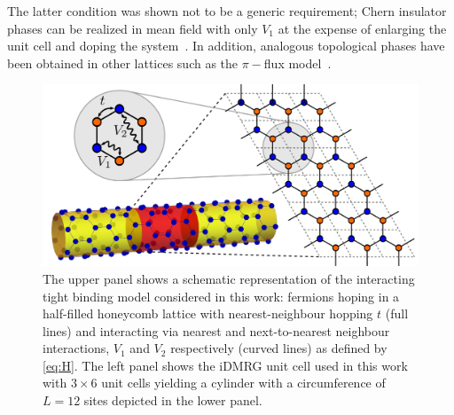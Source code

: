 \documentclass[aps,prx,10pt,twocolumn,floatfix,superscriptaddress,showpacs,numerical,footinbib]{revtex4-1}
\begin{document}
%
The latter condition 
was shown not to be a generic requirement; Chern insulator phases can be realized 
in mean field with only $V_{1}$ at the expense of enlarging the unit cell and doping the system~\cite{CGV11,GCC13}.
%
In addition, analogous topological phases have been obtained in other lattices such as the $\pi-$flux model~\cite{WF10,JGC13}.
%
\begin{figure}
%
 \includegraphics[width=\columnwidth]{pdf/unit_cell.pdf}
 \caption{The upper panel shows a schematic representation of the interacting tight binding model considered in this work:
fermions hoping in a half-filled honeycomb lattice with nearest-neighbour hopping $t$ (full lines) and interacting via
 nearest and next-to-nearest neighbour interactions, $V_{1}$ and $V_{2}$ respectively (curved lines) as defined by 
 \eqref{eq:H}.
 The left panel shows the iDMRG unit cell used in this work with 
 $3 \times 6$ unit cells yielding a cylinder with a circumference of $L=12$ sites depicted in the lower panel. 
 \label{fig:Defs}}
\end{figure}
\\
\end{document}

